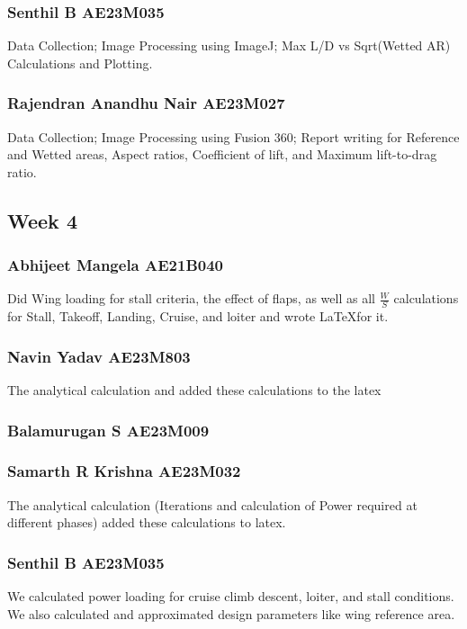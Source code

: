 \documentclass[12 pt]{article}
\begin{document}
{{\subsubsection{Senthil B AE23M035}
Data Collection; Image Processing using ImageJ; Max L/D vs Sqrt(Wetted AR) Calculations and Plotting.


\subsubsection{Rajendran Anandhu Nair AE23M027}
Data Collection; Image Processing using Fusion 360; Report writing for Reference and Wetted areas, Aspect ratios, Coefficient of lift, and Maximum lift-to-drag ratio. 

\subsection{Week 4}


\subsubsection{Abhijeet Mangela AE21B040}
Did Wing loading for stall criteria, the effect of flaps, as well as all $\frac{W}{S}$ calculations for Stall, Takeoff, Landing, Cruise, and loiter and wrote \LaTeX for it.

\subsubsection{Navin Yadav AE23M803}
The analytical calculation and added these calculations to the latex 

\subsubsection{Balamurugan S AE23M009}


\subsubsection{Samarth R Krishna AE23M032}
The analytical calculation (Iterations and calculation of Power required at different phases) added these calculations to latex.


\subsubsection{Senthil B AE23M035}
We calculated power loading for cruise climb descent, loiter, and stall conditions. We also calculated and approximated design parameters like wing reference area.

}}
\end{document}
